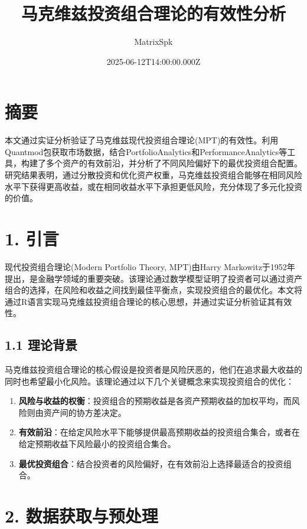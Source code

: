 \documentclass[
]{article}
\title{马克维兹投资组合理论的有效性分析}
\author{MatrixSpk}
\date{2025-06-12T14:00:00.000Z}
\providecommand{\tightlist}{%
  \setlength{\itemsep}{0pt}\setlength{\parskip}{0pt}}
\begin{document}
\maketitle

{
\setcounter{tocdepth}{3}
\tableofcontents
}
\section{摘要}\label{ux6458ux8981}

本文通过实证分析验证了马克维兹现代投资组合理论(MPT)的有效性。利用Quantmod包获取市场数据，结合PortfolioAnalytics和PerformanceAnalytics等工具，构建了多个资产的有效前沿，并分析了不同风险偏好下的最优投资组合配置。研究结果表明，通过分散投资和优化资产权重，马克维兹投资组合能够在相同风险水平下获得更高收益，或在相同收益水平下承担更低风险，充分体现了多元化投资的价值。

\section{1. 引言}\label{ux5f15ux8a00}

现代投资组合理论(Modern Portfolio Theory, MPT)由Harry
Markowitz于1952年提出，是金融学领域的重要突破。该理论通过数学模型证明了投资者可以通过资产组合的选择，在风险和收益之间找到最佳平衡点，实现投资组合的最优化。本文将通过R语言实现马克维兹投资组合理论的核心思想，并通过实证分析验证其有效性。

\subsection{1.1 理论背景}\label{ux7406ux8bbaux80ccux666f}

马克维兹投资组合理论的核心假设是投资者是风险厌恶的，他们在追求最大收益的同时也希望最小化风险。该理论通过以下几个关键概念来实现投资组合的优化：

\begin{enumerate}
\def\labelenumi{\arabic{enumi}.}
\tightlist
\item
  \textbf{风险与收益的权衡}：投资组合的预期收益是各资产预期收益的加权平均，而风险则由资产间的协方差决定。
\item
  \textbf{有效前沿}：在给定风险水平下能够提供最高预期收益的投资组合集合，或者在给定预期收益下风险最小的投资组合集合。
\item
  \textbf{最优投资组合}：结合投资者的风险偏好，在有效前沿上选择最适合的投资组合。
\end{enumerate}

\section{2.
数据获取与预处理}\label{ux6570ux636eux83b7ux53d6ux4e0eux9884ux5904ux7406}
\end{document}
